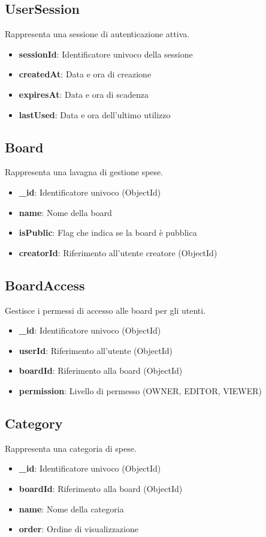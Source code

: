 \documentclass[11pt]{article}
\begin{document}
\subsection{UserSession}
Rappresenta una sessione di autenticazione attiva.
\begin{itemize}
    \item \textbf{sessionId}: Identificatore univoco della sessione
    \item \textbf{createdAt}: Data e ora di creazione
    \item \textbf{expiresAt}: Data e ora di scadenza
    \item \textbf{lastUsed}: Data e ora dell'ultimo utilizzo
\end{itemize}

\subsection{Board}
Rappresenta una lavagna di gestione spese.
\begin{itemize}
    \item \textbf{\_id}: Identificatore univoco (ObjectId)
    \item \textbf{name}: Nome della board
    \item \textbf{isPublic}: Flag che indica se la board è pubblica
    \item \textbf{creatorId}: Riferimento all'utente creatore (ObjectId)
\end{itemize}

\subsection{BoardAccess}
Gestisce i permessi di accesso alle board per gli utenti.
\begin{itemize}
    \item \textbf{\_id}: Identificatore univoco (ObjectId)
    \item \textbf{userId}: Riferimento all'utente (ObjectId)
    \item \textbf{boardId}: Riferimento alla board (ObjectId)
    \item \textbf{permission}: Livello di permesso (OWNER, EDITOR, VIEWER)
\end{itemize}

\subsection{Category}
Rappresenta una categoria di spese.
\begin{itemize}
    \item \textbf{\_id}: Identificatore univoco (ObjectId)
    \item \textbf{boardId}: Riferimento alla board (ObjectId)
    \item \textbf{name}: Nome della categoria
    \item \textbf{order}: Ordine di visualizzazione
\end{itemize}
\end{document}
